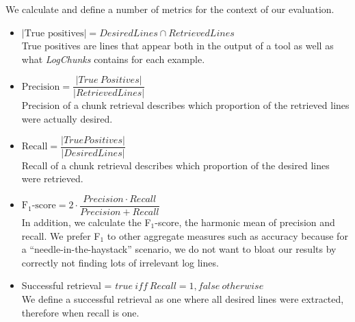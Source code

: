 We calculate and define a number of metrics for the context of our
evaluation.

\vspace{0.2cm}
\begin{itemize}[leftmargin=0.4cm] \itemsep1em
	\item $|\mbox{True positives}| = \mathit{DesiredLines} \cap
	\mathit{RetrievedLines}$ \vspace{0.2cm}\\
	True positives are lines that appear both in the output of a
	tool as well as what \textit{LogChunks} contains for each
	example.

	\item $\mbox{Precision} = \dfrac{|\mathit{True\
	Positives}|}{|\mathit{RetrievedLines}|}$ \vspace{0.21cm} \\
	Precision of a chunk retrieval describes which proportion of
	the retrieved lines were actually desired.

	\item $\mbox{Recall} =
	\dfrac{|\mathit{TruePositives}|}{|\mathit{DesiredLines}|}$
	\vspace{0.2cm} \\
	Recall of a chunk retrieval describes which proportion of the
	desired lines were retrieved.
	\item $\mbox{F$_{1}$-score} = 2 \cdot \dfrac{\mathit{Precision}
	\cdot \mathit{Recall}}{\mathit{Precision} + \mathit{Recall}}$
	\vspace{0.2cm}\\
	In addition, we calculate the F$_{1}$-score, the harmonic mean
	of precision and recall.
We prefer F$_{1}$ to other aggregate
	measures such as accuracy because for a
	``needle-in-the-haystack'' scenario, we do not want to bloat
	our results by correctly not finding lots of irrelevant log
	lines.
	\item Successful retrieval = $\mathit{true}\ \mathit{iff}\
	\mathit{Recall} = 1, \mathit{false\ otherwise}$  \vspace{0.2cm} \\
	We define a successful retrieval as one where all desired
	lines were
	extracted, therefore when recall is one.
\end{itemize}


